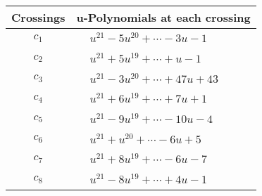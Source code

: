 \documentclass[1p]{elsarticle_modified}
\theoremstyle{definition}
\begin{document}
\begin{tabular}{m{50pt}|m{274pt}}
Crossings & \hspace{64pt}u-Polynomials at each crossing \\
\hline $$\begin{aligned}c_{1}\end{aligned}$$&$\begin{aligned}
&u^{21}-5 u^{20}+\cdots-3 u-1
\end{aligned}$\\
\hline $$\begin{aligned}c_{2}\end{aligned}$$&$\begin{aligned}
&u^{21}+5 u^{19}+\cdots+u-1
\end{aligned}$\\
\hline $$\begin{aligned}c_{3}\end{aligned}$$&$\begin{aligned}
&u^{21}-3 u^{20}+\cdots+47 u+43
\end{aligned}$\\
\hline $$\begin{aligned}c_{4}\end{aligned}$$&$\begin{aligned}
&u^{21}+6 u^{19}+\cdots+7 u+1
\end{aligned}$\\
\hline $$\begin{aligned}c_{5}\end{aligned}$$&$\begin{aligned}
&u^{21}-9 u^{19}+\cdots-10 u-4
\end{aligned}$\\
\hline $$\begin{aligned}c_{6}\end{aligned}$$&$\begin{aligned}
&u^{21}+u^{20}+\cdots-6 u+5
\end{aligned}$\\
\hline $$\begin{aligned}c_{7}\end{aligned}$$&$\begin{aligned}
&u^{21}+8 u^{19}+\cdots-6 u-7
\end{aligned}$\\
\hline $$\begin{aligned}c_{8}\end{aligned}$$&$\begin{aligned}
&u^{21}-8 u^{19}+\cdots+4 u-1
\end{aligned}$\\

\end{tabular}
\end{document}
